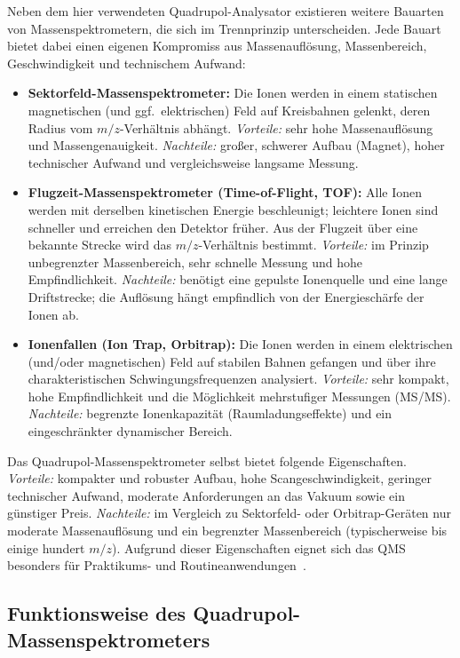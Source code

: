 \documentclass{article}
\begin{document}
Neben dem hier verwendeten Quadrupol-Analysator existieren weitere
Bauarten von Massenspektrometern, die sich im Trennprinzip
unterscheiden. Jede Bauart bietet dabei einen eigenen Kompromiss aus
Massenauflösung, Massenbereich, Geschwindigkeit und technischem Aufwand:
\begin{itemize}
    \item \textbf{Sektorfeld-Massenspektrometer:} Die Ionen werden in
        einem statischen magnetischen (und ggf.\ elektrischen) Feld auf
        Kreisbahnen gelenkt, deren Radius vom $m/z$-Verhältnis abhängt.
        \emph{Vorteile:} sehr hohe Massenauflösung und Massengenauigkeit.
        \emph{Nachteile:} großer, schwerer Aufbau (Magnet), hoher
        technischer Aufwand und vergleichsweise langsame Messung.
    \item \textbf{Flugzeit-Massenspektrometer (Time-of-Flight, TOF):}
        Alle Ionen werden mit derselben kinetischen Energie
        beschleunigt; leichtere Ionen sind schneller und erreichen den
        Detektor früher. Aus der Flugzeit über eine bekannte Strecke
        wird das $m/z$-Verhältnis bestimmt.
        \emph{Vorteile:} im Prinzip unbegrenzter Massenbereich, sehr
        schnelle Messung und hohe Empfindlichkeit.
        \emph{Nachteile:} benötigt eine gepulste Ionenquelle und eine
        lange Driftstrecke; die Auflösung hängt empfindlich von der
        Energieschärfe der Ionen ab.
    \item \textbf{Ionenfallen (Ion Trap, Orbitrap):} Die Ionen werden in
        einem elektrischen (und/oder magnetischen) Feld auf stabilen
        Bahnen gefangen und über ihre charakteristischen
        Schwingungsfrequenzen analysiert.
        \emph{Vorteile:} sehr kompakt, hohe Empfindlichkeit und die
        Möglichkeit mehrstufiger Messungen (MS/MS).
        \emph{Nachteile:} begrenzte Ionenkapazität (Raumladungseffekte)
        und ein eingeschränkter dynamischer Bereich.
\end{itemize}
Das Quadrupol-Massenspektrometer selbst bietet folgende Eigenschaften.
\emph{Vorteile:} kompakter und robuster Aufbau, hohe Scangeschwindigkeit,
geringer technischer Aufwand, moderate Anforderungen an das Vakuum sowie
ein günstiger Preis. \emph{Nachteile:} im Vergleich zu Sektorfeld- oder
Orbitrap-Geräten nur moderate Massenauflösung und ein begrenzter
Massenbereich (typischerweise bis einige hundert $m/z$). Aufgrund dieser
Eigenschaften eignet sich das QMS besonders für Praktikums- und
Routineanwendungen~\cite{gross2017}.

\subsection{Funktionsweise des Quadrupol-Massenspektrometers}
\end{document}
